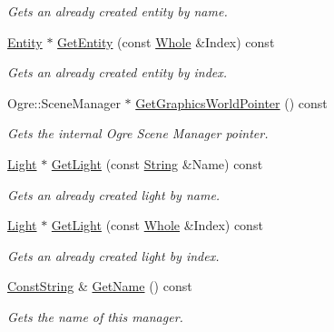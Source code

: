 \begin{DoxyCompactItemize}
\begin{DoxyCompactList}\small\item\em Gets an already created entity by name. \item\end{DoxyCompactList}\item 
\hyperlink{classMezzanine_1_1Entity}{Entity} $\ast$ \hyperlink{classMezzanine_1_1SceneManager_a9ac227854187f7c3e6ecd5acd171888d}{GetEntity} (const \hyperlink{namespaceMezzanine_adcbb6ce6d1eb4379d109e51171e2e493}{Whole} \&Index) const 
\begin{DoxyCompactList}\small\item\em Gets an already created entity by index. \item\end{DoxyCompactList}\item 
Ogre::SceneManager $\ast$ \hyperlink{classMezzanine_1_1SceneManager_a3156d3ec1b514e295368bfa4b94d4adc}{GetGraphicsWorldPointer} () const 
\begin{DoxyCompactList}\small\item\em Gets the internal Ogre Scene Manager pointer. \item\end{DoxyCompactList}\item 
\hyperlink{classMezzanine_1_1Light}{Light} $\ast$ \hyperlink{classMezzanine_1_1SceneManager_ad28337e68dac694721cbb798dedd151f}{GetLight} (const \hyperlink{namespaceMezzanine_acf9fcc130e6ebf08e3d8491aebcf1c86}{String} \&Name) const 
\begin{DoxyCompactList}\small\item\em Gets an already created light by name. \item\end{DoxyCompactList}\item 
\hyperlink{classMezzanine_1_1Light}{Light} $\ast$ \hyperlink{classMezzanine_1_1SceneManager_a38b93841cb86bd2cb9cf4b7431946f8e}{GetLight} (const \hyperlink{namespaceMezzanine_adcbb6ce6d1eb4379d109e51171e2e493}{Whole} \&Index) const 
\begin{DoxyCompactList}\small\item\em Gets an already created light by index. \item\end{DoxyCompactList}\item 
\hyperlink{namespaceMezzanine_a63cd699ac54b73953f35ec9cfc05e506}{ConstString} \& \hyperlink{classMezzanine_1_1SceneManager_ae28b426f75094bad85a2e4c737e2719f}{GetName} () const 
\begin{DoxyCompactList}\small\item\em Gets the name of this manager. \item\end{DoxyCompactList}\item 

\end{DoxyCompactItemize}
